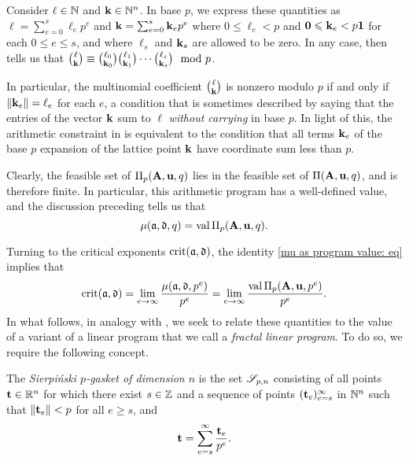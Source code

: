 \documentclass{amsart}
\begin{document}
\begin{remark}
   \label{dickson: R}
   Consider $\ell \in \mathbb{N}$ and $\mathbf{k} \in \mathbb{N}^n$.
   In base $p$, we express these quantities as $\ell = \sum_{e=0}^s \ell_e p^e$ and $\mathbf{k}=\sum_{e=0}^s \mathbf{k}_e p^e$ where $0\le \ell_e < p$ and $\mathbf{0}\leqslant\mathbf{k}_e < p  \mathbf{1}$ for each $0 \leq e \leq s$, and where $\ell_s$ and $\mathbf{k}_s$ are allowed to be zero.
   In any case, \cite{dickson.multinomial} then tells us that $\binom{\ell}{\mathbf{k}}\equiv \binom{\ell_0}{\mathbf{k}_0}\binom{\ell_1}{\mathbf{k}_1}\cdots \binom{\ell_s}{\mathbf{k}_s} \mod{p}$.

   In particular, the multinomial coefficient $\binom{\ell}{\mathbf{k}}$ is nonzero modulo $p$ if and only if $\| \mathbf{k}_e \|=\ell_e$ for each $e$, a condition that is sometimes described by saying that the entries of the vector $\mathbf{k}$ sum to $\ell$ \emph{without carrying} in base $p$.
   In light of this, the arithmetic constraint in  is equivalent to the condition that all terms $\mathbf{k}_e$ of the base $p$ expansion of the lattice point $\mathbf{k}$ have coordinate sum less than $p$.
\end{remark}

Clearly, the feasible set of $\Pi_p(\mathbf{A}, \mathbf{u}, q)$ lies in the feasible set of $\Pi(\mathbf{A}, \mathbf{u},q)$, and is therefore finite.
In particular, this arithmetic program has a well-defined value, and the discussion preceding  tells us that
\begin{equation}
\label{mu as program value: eq}
\mu(\mathfrak{a},\mathfrak{d},q) = \operatorname{val} \Pi_p(\mathbf{A},\mathbf{u},q).
\end{equation}

Turning to the critical exponents $\operatorname{crit}(\mathfrak{a}, \mathfrak{d})$, the identity \eqref{mu as program value: eq} implies that
\begin{equation}
\label{crit as limit of normalized program values: eq}
\operatorname{crit}(\mathfrak{a},\mathfrak{d}) = \lim_{e\to\infty} \frac{\mu(\mathfrak{a},\mathfrak{d},p^e)}{p^e} = \lim_{e\to\infty} \frac{\operatorname{val} \Pi_p(\mathbf{A},\mathbf{u},p^e)}{p^e}.
\end{equation}
In what follows, in analogy with , we seek to relate these quantities to the value of a variant of a linear program that we call a \emph{fractal linear program}.  To do so, we require the following concept.

\begin{definition}
   \label{sierpinski: D}
   The \emph{Sierpi\'nski $p$-gasket of dimension $n$} is the set $\mathscr{S}_{p,n}$ consisting of all points $\mathbf{t}\in \mathbb{R}^n$ for which there exist $s \in \mathbb{Z}$ and a sequence of points $( \mathbf{t}_e )_{e=s}^\infty$ in $\mathbb{N}^n$ such that $\| \mathbf{t}_e \| < p$ for all $e \geq s$, and
 \[
\mathbf{t} = \sum_{e=s}^{\infty} \frac{\mathbf{t}_e}{p^e}.
 \]
\end{definition}
\end{document}

